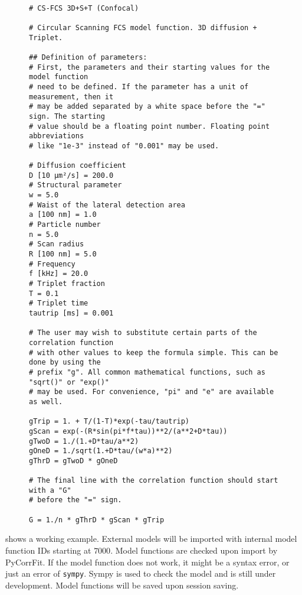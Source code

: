 \begin{figure}[tp]
\small
\begin{Verbatim}[frame = single]

# CS-FCS 3D+S+T (Confocal)

# Circular Scanning FCS model function. 3D diffusion + Triplet.

## Definition of parameters:
# First, the parameters and their starting values for the model function
# need to be defined. If the parameter has a unit of measurement, then it 
# may be added separated by a white space before the "=" sign. The starting
# value should be a floating point number. Floating point abbreviations 
# like "1e-3" instead of "0.001" may be used.

# Diffusion coefficient
D [10 µm²/s] = 200.0
# Structural parameter
w = 5.0
# Waist of the lateral detection area
a [100 nm] = 1.0
# Particle number
n = 5.0
# Scan radius
R [100 nm] = 5.0
# Frequency
f [kHz] = 20.0
# Triplet fraction
T = 0.1
# Triplet time
tautrip [ms] = 0.001

# The user may wish to substitute certain parts of the correlation function
# with other values to keep the formula simple. This can be done by using the
# prefix "g". All common mathematical functions, such as "sqrt()" or "exp()"
# may be used. For convenience, "pi" and "e" are available as well.

gTrip = 1. + T/(1-T)*exp(-tau/tautrip)
gScan = exp(-(R*sin(pi*f*tau))**2/(a**2+D*tau))
gTwoD = 1./(1.+D*tau/a**2)
gOneD = 1./sqrt(1.+D*tau/(w*a)**2)
gThrD = gTwoD * gOneD

# The final line with the correlation function should start with a "G"
# before the "=" sign.

G = 1./n * gThrD * gScan * gTrip

\end{Verbatim}
\end{figure}
 shows a working example. External models will be imported with internal model function IDs starting at $7000$. Model functions are checked upon import by PyCorrFit. If the model function does not work, it might be a syntax error, or just an error of \texttt{sympy}. Sympy is used to check the model and is still under development. Model functions will be saved upon session saving.

